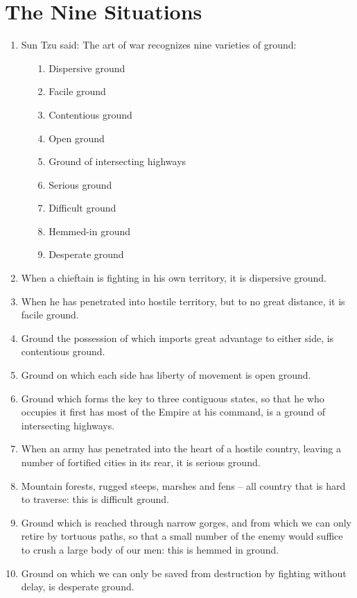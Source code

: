 \documentclass[oneside]{book}
\begin{document}
\chapter{The Nine Situations}
\begin{enumerate}
	\item Sun Tzu said: The art of war recognizes nine varieties of ground:
	\begin{enumerate}
	    \item[1.] Dispersive ground
	    \item[2.] Facile ground
	    \item[3.] Contentious ground
	    \item[4.] Open ground
	    \item[5.] Ground of intersecting highways
	    \item[6.] Serious ground
	    \item[7.] Difficult ground
	    \item[8.] Hemmed-in ground
	    \item[9.] Desperate ground
	\end{enumerate}
	\item When a chieftain is fighting in his own territory, it is dispersive ground.
	\item When he has penetrated into hostile territory, but to no great distance, it is facile ground.
	\item Ground the possession of which imports great advantage to either side, is contentious ground.
	\item Ground on which each side has liberty of movement is open ground.
	\item Ground which forms the key to three contiguous states, so that he who occupies it first has most of the Empire at his command, is a ground of intersecting highways.
	\item When an army has penetrated into the heart of a hostile country, leaving a number of fortified cities in its rear, it is serious ground.
	\item Mountain forests, rugged steeps, marshes and fens – all country that is hard to traverse: this is difficult ground.
	\item Ground which is reached through narrow gorges, and from which we can only retire by tortuous paths, so that a small number of the enemy would suffice to crush a large body of our men: this is hemmed in ground.
	\item Ground on which we can only be saved from destruction by fighting without delay, is desperate ground.

\end{enumerate}
\end{document}
